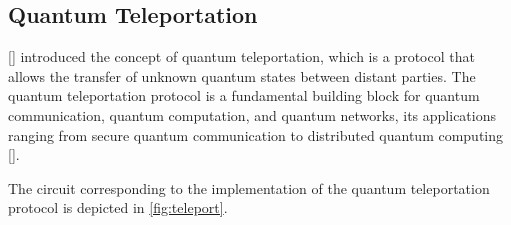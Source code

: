 






\subsection{Quantum Teleportation} \label{sec:teleport}

[\cite{bennett1993teleporting}] introduced the concept of quantum teleportation, which is a protocol that allows the transfer of   unknown quantum states between distant parties.  The quantum teleportation protocol is a fundamental building block for quantum communication, quantum computation, and quantum networks, its applications ranging
from secure quantum communication to distributed quantum computing [\cite{briegel1998quantum,gottesman1999demonstrating,kimble2008quantum}]. %


The circuit corresponding to the implementation of the quantum teleportation protocol is depicted in \autoref{fig:teleport}.

